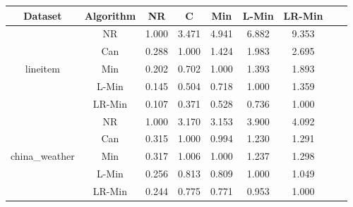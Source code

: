 \documentclass[11pt]{book}
\begin{document}
\begin{table}

	\centering
	
\begin{tabular}{|c|c|c|c|c|c|c|c|c|}

    \hline
    Dataset &
    	Algorithm &
    	NR &
    	C &
    	Min &
    	L-Min &
    	LR-Min \\
    	    
    \hline
    \multirow{5}{*}{lineitem}
         & NR & 1.000 & 3.471 & 4.941 & 6.882 & 9.353 \\                                                                                                                                                             
         & Can & 0.288 & 1.000 & 1.424 & 1.983 & 2.695 \\                                                                                                                                                            
         & Min & 0.202 & 0.702 & 1.000 & 1.393 & 1.893 \\                                                                                                                                                            
         & L-Min & 0.145 & 0.504 & 0.718 & 1.000 & 1.359 \\                                                                                                                                                          
         & LR-Min & 0.107 & 0.371 & 0.528 & 0.736 & 1.000 \\ 	

    \hline
    \multirow{5}{*}{china\_weather}
         & NR & 1.000 & 3.170 & 3.153 & 3.900 & 4.092 \\                                                                                                                                                             
         & Can & 0.315 & 1.000 & 0.994 & 1.230 & 1.291 \\                                                                                                                                                            
         & Min & 0.317 & 1.006 & 1.000 & 1.237 & 1.298 \\                                                                                                                                                            
         & L-Min & 0.256 & 0.813 & 0.809 & 1.000 & 1.049 \\                                                                                                                                                          
         & LR-Min & 0.244 & 0.775 & 0.771 & 0.953 & 1.000 \\
         

\end{tabular}
\end{table}
\end{document}
